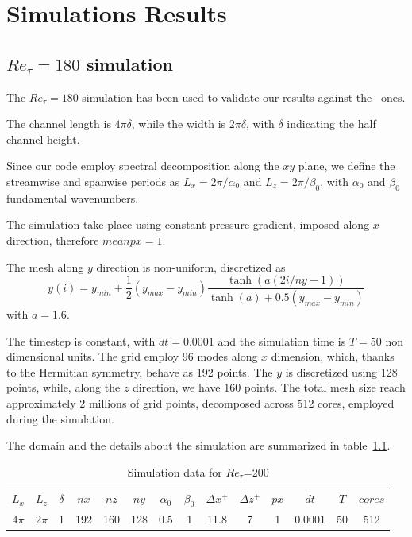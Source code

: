 \chapter{Simulations Results}
\section{$Re_{\tau}=180$ simulation}

The $Re_{\tau}=180$ simulation has been used to validate our results against the~\cite{kim_moin_moser} ones. \par

The channel length is $4\pi \delta$, while the width is $2 \pi \delta$, with $\delta$ indicating the half channel height. \par
Since our code employ spectral decomposition along the $xy$ plane, we define the streamwise and spanwise periods as $L_{x}= 2\pi /\alpha_{0}$ and $L_{z}=2\pi /\beta_{0}$, with $\alpha_{0}$ and $\beta_{0}$ fundamental wavenumbers. \par
The simulation take place using constant pressure gradient, imposed along $x$ direction, therefore $meanpx=1$.\par
The mesh along $y$ direction is non-uniform, discretized as
\begin{equation*}
y(i)=y_{min}+\frac{1}{2}(y_{max}-y_{min})  \frac{\tanh(a(2i/ny-1))}{\tanh(a)+0.5(y_{max}-y_{min})}
\end{equation*}
with $a=1.6$.\par
The timestep is constant, with $dt=0.0001$ and the simulation time is $T=50$ non dimensional units.
The grid employ 96 modes along $x$ dimension, which, thanks to the Hermitian symmetry, behave as 192 points. The $y$ is discretized using 128 points, while, along the $z$ direction, we have 160 points. The total mesh size reach approximately 2 millions of grid points, decomposed across 512 cores, employed during the simulation. 

The domain and the details about the simulation are summarized in table~\ref{table:180}.\par
\begin{table}[h]
\caption{Simulation data for $Re_{\tau}$=200}
\begin{center}
\begin{tabular}{cccccccccccccc}
\toprule
$L_{x}$ & $L_{z}$ & $\delta$ & $nx$ & $nz$ & $ny$ & $\alpha_{0}$ & $\beta_{0}$ & $\Delta x^{+}$ & $\Delta z^{+}$ & $px$ & $dt$ & $T$ & $cores$\\
$4\pi$ & $2\pi$ & 1 & 192 & 160 & 128 & 0.5 & 1 & 11.8  & 7 & 1 & 0.0001 & 50 & 512\\
\bottomrule
\end{tabular}
\end{center}
\label{table:180}
\end{table}


